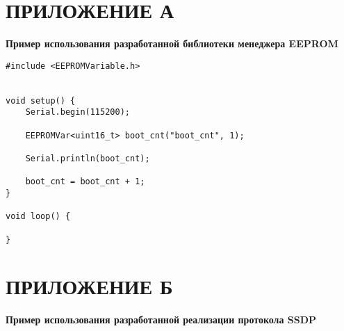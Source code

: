 \chapter*{ПРИЛОЖЕНИЕ А} \label{appendix:eeprom-usage-example}

\begin{center}
    \bfseries Пример использования разработанной библиотеки менеджера EEPROM
\end{center}

\begin{verbatim}
#include <EEPROMVariable.h>


void setup() {
    Serial.begin(115200);

    EEPROMVar<uint16_t> boot_cnt("boot_cnt", 1);

    Serial.println(boot_cnt);

    boot_cnt = boot_cnt + 1;
}

void loop() {

}
\end{verbatim}


\chapter*{ПРИЛОЖЕНИЕ Б} \label{appendix:ssdp-usage-example}

\begin{center}
    \bfseries Пример использования разработанной реализации протокола SSDP
\end{center}

